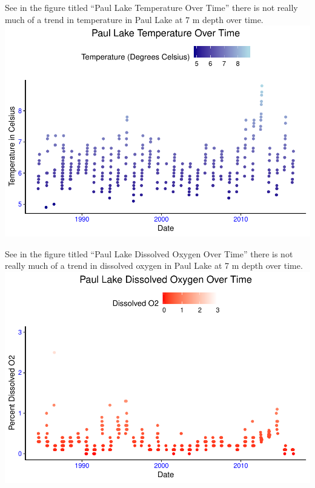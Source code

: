 \documentclass[12pt,]{article}
\begin{document}
See in the figure titled ``Paul Lake Temperature Over Time'' there is
not really much of a trend in temperature in Paul Lake at 7 m depth over
time.
\includegraphics{Bollt_ENV872_FinalProject_files/figure-latex/visualization3-1.pdf}

See in the figure titled ``Paul Lake Dissolved Oxygen Over Time'' there
is not really much of a trend in dissolved oxygen in Paul Lake at 7 m
depth over time.
\includegraphics{Bollt_ENV872_FinalProject_files/figure-latex/visualization4-1.pdf}
\end{document}
